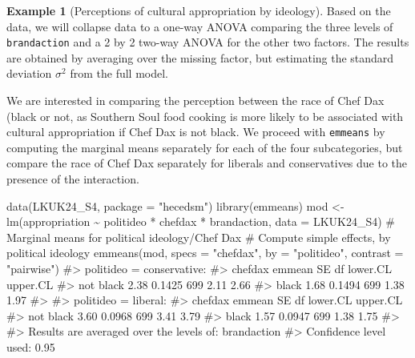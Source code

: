 \documentclass[
  11pt,
  letterpaper,
]{scrbook}
\newenvironment{Shaded}{\begin{snugshade}}{\end{snugshade}}
\newcommand{\AttributeTok}[1]{\textcolor[rgb]{0.40,0.45,0.13}{#1}}
\newcommand{\CommentTok}[1]{\textcolor[rgb]{0.37,0.37,0.37}{#1}}
\newcommand{\FunctionTok}[1]{\textcolor[rgb]{0.28,0.35,0.67}{#1}}
\newcommand{\NormalTok}[1]{\textcolor[rgb]{0.00,0.23,0.31}{#1}}
\newcommand{\OtherTok}[1]{\textcolor[rgb]{0.00,0.23,0.31}{#1}}
\newcommand{\SpecialCharTok}[1]{\textcolor[rgb]{0.37,0.37,0.37}{#1}}
\newcommand{\StringTok}[1]{\textcolor[rgb]{0.13,0.47,0.30}{#1}}
\theoremstyle{definition}
\theoremstyle{definition}
\newtheorem{example}{Example}[chapter]
\theoremstyle{plain}
\theoremstyle{plain}
\theoremstyle{remark}
\begin{document}
\begin{example}[Perceptions of cultural appropriation by
ideology]
Based on the data, we will collapse data to a one-way ANOVA comparing
the three levels of \texttt{brandaction} and a 2 by 2 two-way ANOVA for
the other two factors. The results are obtained by averaging over the
missing factor, but estimating the standard deviation \(\sigma^2\) from
the full model.

We are interested in comparing the perception between the race of Chef
Dax (black or not, as Southern Soul food cooking is more likely to be
associated with cultural appropriation if Chef Dax is not black. We
proceed with \texttt{emmeans} by computing the marginal means separately
for each of the four subcategories, but compare the race of Chef Dax
separately for liberals and conservatives due to the presence of the
interaction.

\begin{Shaded}
\begin{Highlighting}[]
\FunctionTok{data}\NormalTok{(LKUK24\_S4, }\AttributeTok{package =} \StringTok{"hecedsm"}\NormalTok{)}
\FunctionTok{library}\NormalTok{(emmeans)}
\NormalTok{mod }\OtherTok{\textless{}{-}} \FunctionTok{lm}\NormalTok{(appropriation }\SpecialCharTok{\textasciitilde{}}\NormalTok{ politideo }\SpecialCharTok{*}\NormalTok{ chefdax }\SpecialCharTok{*}\NormalTok{ brandaction,}
   \AttributeTok{data =}\NormalTok{ LKUK24\_S4)}
\CommentTok{\# Marginal means for political ideology/Chef Dax}
\CommentTok{\# Compute simple effects, by political ideology}
\FunctionTok{emmeans}\NormalTok{(mod, }
         \AttributeTok{specs =} \StringTok{"chefdax"}\NormalTok{, }
         \AttributeTok{by =} \StringTok{"politideo"}\NormalTok{,}
         \AttributeTok{contrast =} \StringTok{"pairwise"}\NormalTok{)}
\CommentTok{\#\textgreater{} politideo = conservative:}
\CommentTok{\#\textgreater{}  chefdax   emmean     SE  df lower.CL upper.CL}
\CommentTok{\#\textgreater{}  not black   2.38 0.1425 699     2.11     2.66}
\CommentTok{\#\textgreater{}  black       1.68 0.1494 699     1.38     1.97}
\CommentTok{\#\textgreater{} }
\CommentTok{\#\textgreater{} politideo = liberal:}
\CommentTok{\#\textgreater{}  chefdax   emmean     SE  df lower.CL upper.CL}
\CommentTok{\#\textgreater{}  not black   3.60 0.0968 699     3.41     3.79}
\CommentTok{\#\textgreater{}  black       1.57 0.0947 699     1.38     1.75}
\CommentTok{\#\textgreater{} }
\CommentTok{\#\textgreater{} Results are averaged over the levels of: brandaction }
\CommentTok{\#\textgreater{} Confidence level used: 0.95}
\end{Highlighting}
\end{Shaded}


\end{example}
\end{document}
